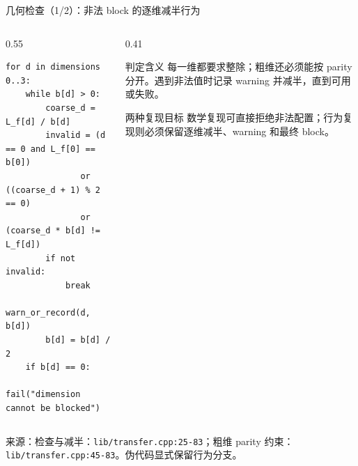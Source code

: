 \documentclass[UTF8,aspectratio=169,11pt]{ctexbeamer}
\newcommand{\source}[1]{\vspace{0.05em}\par{\raggedright\scriptsize\color{muted}来源：#1\par}}
\newcommand{\codepath}[1]{\nolinkurl{#1}}
\begin{document}
\begin{frame}[fragile,t]{几何检查（1/2）：非法 block 的逐维减半行为}
  \begin{columns}[T,totalwidth=\textwidth]
    \begin{column}{0.55\textwidth}
      \begin{lstlisting}[firstnumber=1]
for d in dimensions 0..3:
    while b[d] > 0:
        coarse_d = L_f[d] / b[d]
        invalid = (d == 0 and L_f[0] == b[0])
               or ((coarse_d + 1) % 2 == 0)
               or (coarse_d * b[d] != L_f[d])
        if not invalid:
            break
        warn_or_record(d, b[d])
        b[d] = b[d] / 2
    if b[d] == 0:
        fail("dimension cannot be blocked")
      \end{lstlisting}
    \end{column}
    \begin{column}{0.41\textwidth}
      \begin{block}{判定含义}
        每一维都要求整除；粗维还必须能按 parity 分开。遇到非法值时记录 warning 并减半，直到可用或失败。
      \end{block}
      \begin{alertblock}{两种复现目标}
        数学复现可直接拒绝非法配置；行为复现则必须保留逐维减半、warning 和最终 block。
      \end{alertblock}
    \end{column}
  \end{columns}
  \source{检查与减半：\codepath{lib/transfer.cpp:25-83}；粗维 parity 约束：\codepath{lib/transfer.cpp:45-83}。伪代码显式保留行为分支。}
\end{frame}
\end{document}
